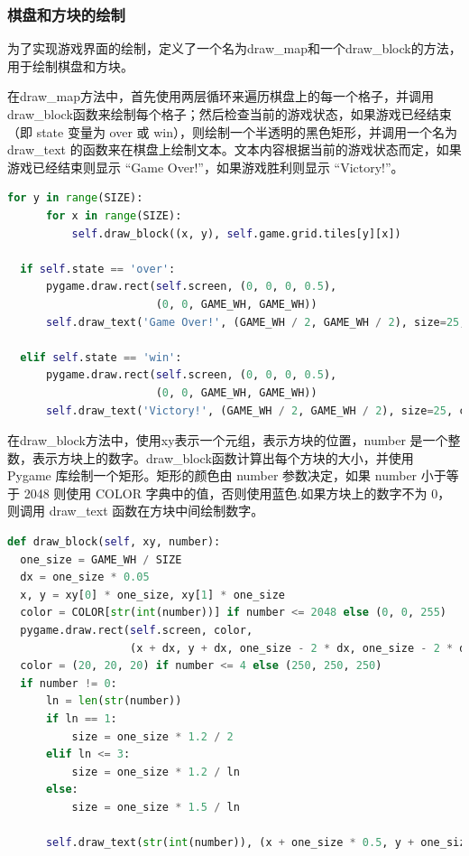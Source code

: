 \documentclass[UTF8,AutoFakeBold,AutoFakeSlant,zihao=-4]{ctexart}
\begin{document}
\subsubsection{棋盘和方块的绘制}
为了实现游戏界面的绘制，定义了一个名为draw\_map和一个draw\_block的方法，用于绘制棋盘和方块。

在draw\_map方法中，首先使用两层循环来遍历棋盘上的每一个格子，并调用draw\_block函数来绘制每个格子；然后检查当前的游戏状态，如果游戏已经结束（即 state 变量为 over 或 win），则绘制一个半透明的黑色矩形，并调用一个名为 draw\_text 的函数来在棋盘上绘制文本。文本内容根据当前的游戏状态而定，如果游戏已经结束则显示 “Game Over!”，如果游戏胜利则显示 “Victory!”。

\begin{lstlisting}[language=Python]
  for y in range(SIZE):
      for x in range(SIZE):
          self.draw_block((x, y), self.game.grid.tiles[y][x])

  if self.state == 'over':
      pygame.draw.rect(self.screen, (0, 0, 0, 0.5),
                       (0, 0, GAME_WH, GAME_WH))
      self.draw_text('Game Over!', (GAME_WH / 2, GAME_WH / 2), size=25, center='center')

  elif self.state == 'win':
      pygame.draw.rect(self.screen, (0, 0, 0, 0.5),
                       (0, 0, GAME_WH, GAME_WH))
      self.draw_text('Victory!', (GAME_WH / 2, GAME_WH / 2), size=25, center='center')
  \end{lstlisting}

  在draw\_block方法中，使用xy表示一个元组，表示方块的位置，number 是一个整数，表示方块上的数字。draw\_block函数计算出每个方块的大小，并使用 Pygame 库绘制一个矩形。矩形的颜色由 number 参数决定，如果 number 小于等于 2048 则使用 COLOR 字典中的值，否则使用蓝色.如果方块上的数字不为 0，则调用 draw\_text 函数在方块中间绘制数字。
\begin{lstlisting}[language=Python]
  def draw_block(self, xy, number):
  one_size = GAME_WH / SIZE
  dx = one_size * 0.05
  x, y = xy[0] * one_size, xy[1] * one_size
  color = COLOR[str(int(number))] if number <= 2048 else (0, 0, 255)
  pygame.draw.rect(self.screen, color,
                   (x + dx, y + dx, one_size - 2 * dx, one_size - 2 * dx))
  color = (20, 20, 20) if number <= 4 else (250, 250, 250)
  if number != 0:
      ln = len(str(number))
      if ln == 1:
          size = one_size * 1.2 / 2
      elif ln <= 3:
          size = one_size * 1.2 / ln
      else:
          size = one_size * 1.5 / ln

      self.draw_text(str(int(number)), (x + one_size * 0.5, y + one_size * 0.5 - size / 2), color, size, 'center')
\end{lstlisting}
\end{document}

